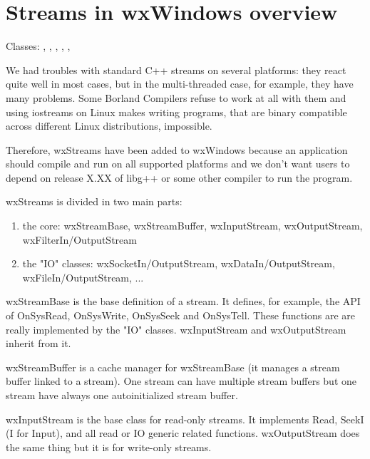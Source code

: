 \section{Streams in wxWindows overview}\label{wxstreamoverview}

Classes: ,
 , ,
 ,
 ,


We had troubles with standard C++ streams on several platforms:
they react quite well in most cases, but in the multi-threaded case, for example,
they have many problems. Some Borland Compilers refuse to work at all
with them and using iostreams on Linux makes writing programs, that are
binary compatible across different Linux distributions, impossible.

Therefore, wxStreams have been added to wxWindows because an application should 
compile and run on all supported platforms and we don't want users to depend on release
X.XX of libg++ or some other compiler to run the program.

wxStreams is divided in two main parts:

\begin{enumerate}\itemsep=0pt
\item the core: wxStreamBase, wxStreamBuffer, wxInputStream, wxOutputStream,
wxFilterIn/OutputStream
\item the "IO" classes: wxSocketIn/OutputStream, wxDataIn/OutputStream, wxFileIn/OutputStream, ...
\end{enumerate}

wxStreamBase is the base definition of a stream. It defines, for example,
the API of OnSysRead, OnSysWrite, OnSysSeek and OnSysTell. These functions are
are really implemented by the "IO" classes.
wxInputStream and wxOutputStream inherit from it.

wxStreamBuffer is a cache manager for wxStreamBase (it manages a stream buffer
linked to a stream). One stream can have multiple stream buffers  but one stream
have always one autoinitialized stream buffer.

wxInputStream is the base class for read-only streams. It implements Read,
SeekI (I for Input), and all read or IO generic related functions.
wxOutputStream does the same thing but it is for write-only streams.


